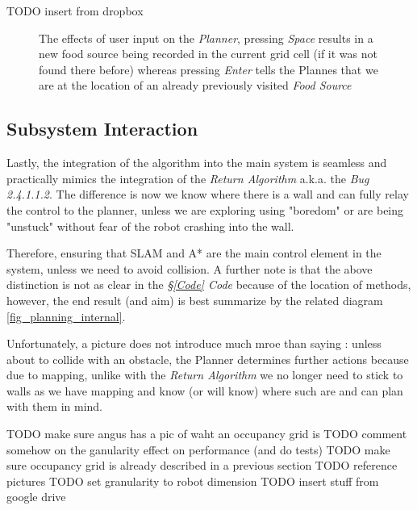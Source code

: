 \documentclass[11pt, a4paper]{article}
\begin{document}
TODO insert from dropbox 

\begin{figure}
	  \caption{The effects of user input on the \textit{Planner}, pressing \textit{Space} results in a new food source being 
		recorded in the current grid cell (if it was not found there before) whereas pressing \textit{Enter} tells the Plannes
		 that we are at the location of an already previously visited \textit{Food Source}}
\end{figure} 



\subsection{Subsystem Interaction}

Lastly, the integration of the algorithm into the main system is seamless and practically mimics the integration of the \textit{Return Algorithm}\cite{task2_report} a.k.a. the \textit{Bug 2.4.1.1.2}. The difference is now we know where there is a wall and can fully relay the control to the planner, unless we are exploring using "boredom"\cite{task2_report} or are being "unstuck"\cite{task2_report} without fear of the robot crashing into the wall. 

Therefore, ensuring that SLAM and A* are the main control element in the system, unless we need to avoid collision. A further note is that the above distinction is not as clear in the \textit{\S\ref{Code} Code} because of the location of methods, however, the end result (and aim) is best summarize by the related diagram \ref{fig_planning_internal}.

Unfortunately, a picture does not introduce much mroe than saying : unless about to collide with an obstacle, the Planner determines further actions because due to mapping, unlike with the \textit{Return Algorithm}\cite{task2_report} we no longer need to stick to walls as we have mapping and know (or will know) where such are and can plan with them in mind.









TODO make sure angus has a pic of waht an occupancy grid is
TODO comment somehow on the ganularity effect on performance (and do tests)
TODO make sure occupancy grid is already described in a previous section
TODO reference pictures
TODO set granularity to robot dimension
TODO insert stuff from google drive
\end{document}
